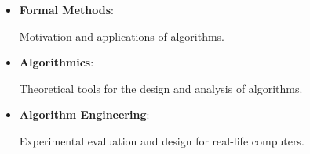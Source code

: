 \documentclass[english, aspectratio=169]{beamer}
\begin{document}

%
\blankframe

%
%
%
\begin{frame}
  \Large

  \begin{itemize}
  \item \textbf{Formal Methods}:

    Motivation and applications of algorithms.

  \item \textbf{Algorithmics}:

    Theoretical tools for the design and analysis of algorithms.

  \item \textbf{Algorithm Engineering}:

    Experimental evaluation and design for real-life computers.
  \end{itemize}
\end{frame}
\end{document}
